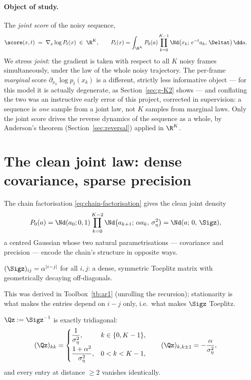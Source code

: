 \paragraph{Object of study.} The \emph{joint score} of the noisy sequence,
\begin{equation}
  \score(x, t) \;=\; \nabla_x \log P_t(x) \;\in\; \R^K,
  \qquad
  P_t(x) = \int_{\R^K} P_0(a) \prod_{k=0}^{K-1}
    \Nd\big(x_k;\, e^{-t}a_k,\, \Deltat\big)\, \dd a .
  \label{eq:g-object}
\end{equation}
We stress \emph{joint}: the gradient is taken with respect to all $K$ noisy
frames simultaneously, under the law of the whole noisy trajectory. The
per-frame \emph{marginal} score $\partial_{x_k} \log p_t(x_k)$ is a
different, strictly less informative object --- for this model it is
actually degenerate, as Section~\ref{sec:g-K2} shows --- and conflating the
two was an instructive early error of this project, corrected in
supervision: a sequence is \emph{one} sample from a joint law, not $K$
samples from marginal laws. Only the joint score drives the reverse dynamics
of the sequence as a whole, by Anderson's theorem
(Section~\ref{sec:reversal}) applied in $\R^K$.

\section{The clean joint law: dense covariance, sparse precision}
\label{sec:g-clean}

The chain factorisation \eqref{eq:chain-factorisation} gives the clean joint
density
\begin{equation}
  P_0(a)
  = \Nd(a_0; 0, 1) \prod_{k=0}^{K-2}
    \Nd\big(a_{k+1};\, \alpha a_k,\, \sigma_\eta^2\big)
  = \Nd(a;\, 0,\, \Sigz),
  \label{eq:g-P0}
\end{equation}
a centred Gaussian whose two natural parametrisations --- covariance and
precision --- encode the chain's structure in opposite ways.

\begin{proposition}\label{prop:g-Sigma0}
$(\Sigz)_{ij} = \alpha^{|i-j|}$ for all $i, j$: a dense, symmetric Toeplitz
matrix with geometrically decaying off-diagonals.
\end{proposition}

This was derived in Toolbox~\ref{tb:ar1} (unrolling the recursion);
stationarity is
what makes the entries depend on $i - j$ only, i.e.\ what makes $\Sigz$
Toeplitz.

\begin{proposition}\label{prop:g-Q0}
$\Qz := \Sigz^{-1}$ is exactly tridiagonal:
\begin{equation}
  (\Qz)_{kk} =
  \begin{cases}
    \dfrac{1}{\sigma_\eta^2}, & k \in \{0, K-1\},\\[8pt]
    \dfrac{1+\alpha^2}{\sigma_\eta^2}, & 0 < k < K-1,
  \end{cases}
  \qquad
  (\Qz)_{k, k\pm 1} = -\frac{\alpha}{\sigma_\eta^2},
  \label{eq:g-Q0}
\end{equation}
and every entry at distance $\geq 2$ vanishes identically.
\end{proposition}

